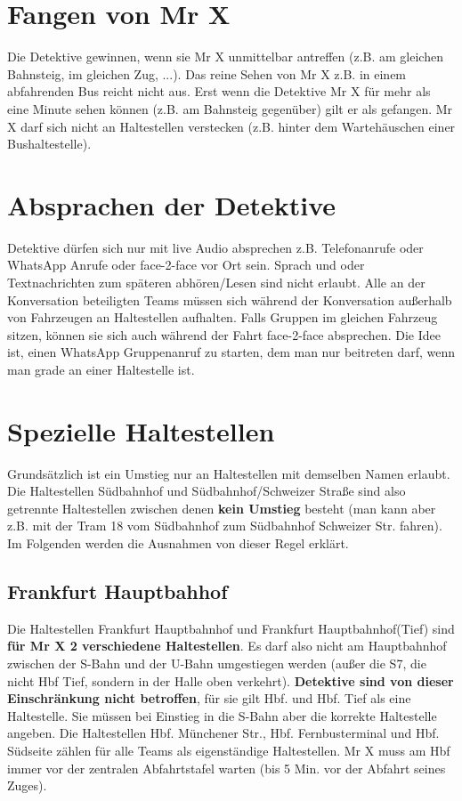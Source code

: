 \documentclass[12pt,a4paper]{article}
\begin{document}
\section{Fangen von Mr X}
Die Detektive gewinnen, wenn sie Mr X unmittelbar antreffen (z.B. am gleichen Bahnsteig, im gleichen Zug, ...).
Das reine Sehen von Mr X z.B. in einem abfahrenden Bus reicht nicht aus.
Erst wenn die Detektive Mr X für mehr als eine Minute sehen können (z.B. am Bahnsteig gegenüber) gilt er als gefangen.
Mr X darf sich nicht an Haltestellen verstecken (z.B. hinter dem Wartehäuschen einer Bushaltestelle).

\section{Absprachen der Detektive}
Detektive dürfen sich nur mit live Audio absprechen z.B. Telefonanrufe oder WhatsApp Anrufe oder face-2-face vor Ort sein.
Sprach und oder Textnachrichten zum späteren abhören/Lesen sind nicht erlaubt.
Alle an der Konversation beteiligten Teams müssen sich während der Konversation außerhalb von Fahrzeugen an Haltestellen aufhalten.
Falls Gruppen im gleichen Fahrzeug sitzen, können sie sich auch während der Fahrt face-2-face absprechen.
Die Idee ist, einen WhatsApp Gruppenanruf zu starten, dem man nur beitreten darf, wenn man grade an einer Haltestelle ist.

\section{Spezielle Haltestellen}
Grundsätzlich ist ein Umstieg nur an Haltestellen mit demselben Namen erlaubt. 
Die Haltestellen Südbahnhof und Südbahnhof/Schweizer Straße sind also getrennte Haltestellen zwischen denen \textbf{kein Umstieg} besteht (man kann aber z.B. mit der Tram 18 vom Südbahnhof zum Südbahnhof Schweizer Str. fahren).
Im Folgenden werden die Ausnahmen von dieser Regel erklärt.

\subsection{Frankfurt Hauptbahhof}
Die Haltestellen Frankfurt Hauptbahnhof und Frankfurt Hauptbahnhof(Tief) sind \textbf{für Mr X 2 verschiedene Haltestellen}.
Es darf also nicht am Hauptbahnhof zwischen der S-Bahn und der U-Bahn umgestiegen werden (außer  die S7, die nicht Hbf Tief, sondern in der Halle oben verkehrt).
\textbf{Detektive sind von dieser Einschränkung nicht betroffen}, für sie gilt Hbf. und Hbf. Tief als eine Haltestelle.
Sie müssen bei Einstieg in die S-Bahn aber die korrekte Haltestelle angeben.
Die Haltestellen Hbf. Münchener Str., Hbf. Fernbusterminal und Hbf. Südseite zählen für alle Teams als eigenständige Haltestellen.
Mr X muss am Hbf immer vor der zentralen Abfahrtstafel warten (bis 5 Min. vor der Abfahrt seines Zuges).
\end{document}
